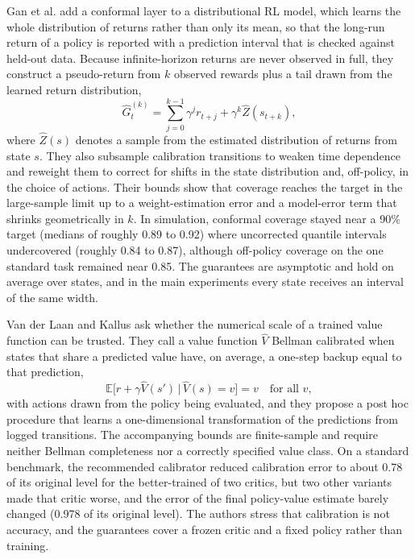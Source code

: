 \documentclass[conference]{IEEEtran}
\begin{document}
Gan et al. \cite{gan2025conformal} add a conformal layer to a distributional RL model, which learns the whole distribution of returns rather than only its mean, so that the long-run return of a policy is reported with a prediction interval that is checked against held-out data. Because infinite-horizon returns are never observed in full, they construct a pseudo-return from $k$ observed rewards plus a tail drawn from the learned return distribution,
\begin{equation}
\hat{G}^{(k)}_{t} = \sum_{j=0}^{k-1} \gamma^{j} r_{t+j} + \gamma^{k} \hat{Z}(s_{t+k}),
\label{eq:pseudoreturn}
\end{equation}
where $\hat{Z}(s)$ denotes a sample from the estimated distribution of returns from state $s$. They also subsample calibration transitions to weaken time dependence and reweight them to correct for shifts in the state distribution and, off-policy, in the choice of actions. Their bounds show that coverage reaches the target in the large-sample limit up to a weight-estimation error and a model-error term that shrinks geometrically in $k$. In simulation, conformal coverage stayed near a 90\% target (medians of roughly 0.89 to 0.92) where uncorrected quantile intervals undercovered (roughly 0.84 to 0.87), although off-policy coverage on the one standard task remained near 0.85. The guarantees are asymptotic and hold on average over states, and in the main experiments every state receives an interval of the same width.

Van der Laan and Kallus \cite{vanderlaan2026bellman} ask whether the numerical scale of a trained value function can be trusted. They call a value function $\hat{V}$ Bellman calibrated when states that share a predicted value have, on average, a one-step backup equal to that prediction,
\begin{equation}
\mathbb{E}\big[r + \gamma \hat{V}(s') \,\big|\, \hat{V}(s) = v\big] = v \quad \text{for all } v,
\label{eq:bellmancal}
\end{equation}
with actions drawn from the policy being evaluated, and they propose a post hoc procedure that learns a one-dimensional transformation of the predictions from logged transitions. The accompanying bounds are finite-sample and require neither Bellman completeness nor a correctly specified value class. On a standard benchmark, the recommended calibrator reduced calibration error to about 0.78 of its original level for the better-trained of two critics, but two other variants made that critic worse, and the error of the final policy-value estimate barely changed (0.978 of its original level). The authors stress that calibration is not accuracy, and the guarantees cover a frozen critic and a fixed policy rather than training.
\end{document}
